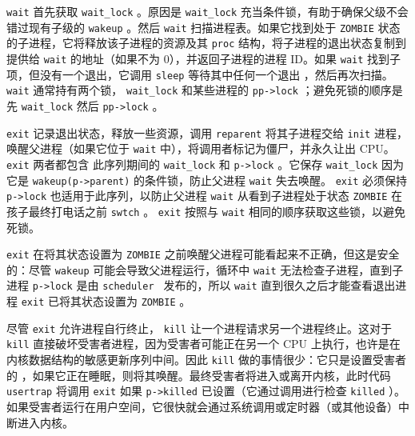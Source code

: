    \lstinline{wait}    首先获取
    \lstinline{wait_lock}   
        。原因是    \lstinline{wait_lock}    充当条件锁，有助于确保父级不会错过现有子级的    \lstinline{wakeup}   。然后   \lstinline{wait}   扫描进程表。如果它找到处于    \texttt{ZOMBIE}    状态的子进程，它将释放该子进程的资源及其    \lstinline{proc}    结构，将子进程的退出状态复制到提供给    \lstinline{wait}    的地址（如果不为 0），并返回子进程的进程 ID。如果
    \lstinline{wait}    找到子项，但没有一个退出，它调用
    \lstinline{sleep}    等待其中任何一个退出
        ，然后再次扫描。
    \lstinline{wait}   通常持有两个锁，
    \lstinline{wait_lock}    和某些进程的    \lstinline{pp->lock}    ；避免死锁的顺序是先    \lstinline{wait_lock}    然后    \lstinline{pp->lock}    。  

   \lstinline{exit}           记录退出状态，释放一些资源，调用    \lstinline{reparent}    将其子进程交给    \lstinline{init}    进程，唤醒父进程（如果它位于    \lstinline{wait}    中），将调用者标记为僵尸，并永久让出 CPU。    \lstinline{exit}    两者都包含
 此序列期间的    \lstinline{wait_lock}    和    \lstinline{p->lock}   。它保存    \lstinline{wait_lock}    因为它是    \lstinline{wakeup(p->parent)}    的条件锁，防止父进程
    \lstinline{wait}    失去唤醒。    \lstinline{exit}    必须保持
    \lstinline{p->lock}    也适用于此序列，以防止父进程
    \lstinline{wait}    从看到子进程处于状态
    \lstinline{ZOMBIE}    在孩子最终打电话之前
    \lstinline{swtch}    。    \lstinline{exit}    按照与    \lstinline{wait}    相同的顺序获取这些锁，以避免死锁。  

   \lstinline{exit}    在将其状态设置为    \lstinline{ZOMBIE}    之前唤醒父进程可能看起来不正确，但这是安全的：尽管
    \lstinline{wakeup}    可能会导致父进程运行，循环中
    \lstinline{wait}    无法检查子进程，直到子进程
    \lstinline{p->lock}    是由  {    \tt    scheduler   }  发布的，所以
    \lstinline{wait}    直到很久之后才能查看退出进程
    \lstinline{exit}    已将其状态设置为
    \lstinline{ZOMBIE}   
        。  

尽管
    \lstinline{exit}    允许进程自行终止，
    \lstinline{kill}   
        让一个进程请求另一个进程终止。这对于
    \lstinline{kill}    直接破坏受害者进程，因为受害者可能正在另一个 CPU 上执行，也许是在内核数据结构的敏感更新序列中间。因此
    \lstinline{kill}    做的事情很少：它只是设置受害者的
       ，如果它正在睡眠，则将其唤醒。最终受害者将进入或离开内核，此时代码
    \lstinline{usertrap}    将调用
    \lstinline{exit}    如果
    \lstinline{p->killed}    已设置（它通过调用进行检查
    \lstinline{killed}   
        ）。如果受害者运行在用户空间，它很快就会通过系统调用或定时器（或其他设备）中断进入内核。  

